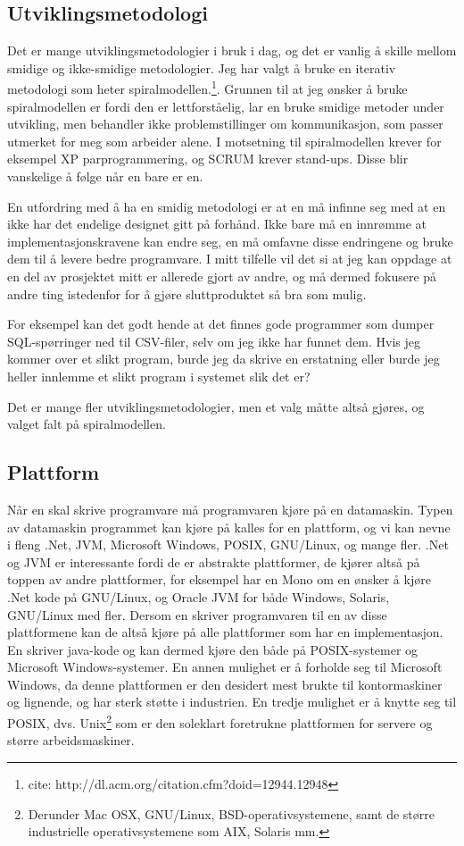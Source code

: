 \documentclass[11pt]{article}
\begin{document}
\subsection{Utviklingsmetodologi}
Det er mange utviklingsmetodologier i bruk i dag, og det er vanlig å skille mellom smidige og ikke-smidige metodologier. Jeg har valgt å bruke en iterativ metodologi som heter spiralmodellen.\footnote{cite: http://dl.acm.org/citation.cfm?doid=12944.12948}.
Grunnen til at jeg ønsker å bruke spiralmodellen er fordi den er lettforståelig, lar en bruke smidige metoder under utvikling, men behandler ikke problemstillinger om kommunikasjon, som passer utmerket for meg som arbeider alene.
I motsetning til spiralmodellen krever for eksempel XP parprogrammering, og SCRUM krever stand-ups. Disse blir vanskelige å følge når en bare er en.

En utfordring med å ha en smidig metodologi er at en må infinne seg med at en ikke har det endelige designet gitt på forhånd. Ikke bare må en innrømme at implementasjonskravene kan endre seg, en må omfavne disse endringene og bruke dem til å levere bedre programvare. I mitt tilfelle vil det si at jeg kan oppdage at en del av prosjektet mitt er allerede gjort av andre, og må dermed fokusere på andre ting istedenfor for å gjøre sluttproduktet så bra som mulig.

For eksempel kan det godt hende at det finnes gode programmer som dumper SQL-spørringer ned til CSV-filer, selv om jeg ikke har funnet dem. Hvis jeg kommer over et slikt program, burde jeg da skrive en erstatning eller burde jeg heller innlemme et slikt program i systemet slik det er?

Det er mange fler utviklingsmetodologier, men et valg måtte altså gjøres, og valget falt på spiralmodellen.

\subsection{Plattform}
Når en skal skrive programvare må programvaren kjøre på en datamaskin. Typen av datamaskin programmet kan kjøre på kalles for en plattform, og vi kan nevne i fleng .Net, JVM, Microsoft Windows, POSIX, GNU/Linux, og mange fler.
.Net og JVM er interessante fordi de er abstrakte plattformer, de kjører altså på toppen av andre plattformer, for eksempel har en Mono om en ønsker å kjøre .Net kode på GNU/Linux, og Oracle JVM for både Windows, Solaris, GNU/Linux med fler.
Dersom en skriver programvaren til en av disse plattformene kan de altså kjøre på alle plattformer som har en implementasjon. En skriver java-kode og kan dermed kjøre den både på POSIX-systemer og Microsoft Windows-systemer.
En annen mulighet er å forholde seg til Microsoft Windows, da denne plattformen er den desidert mest brukte til kontormaskiner og lignende, og har sterk støtte i industrien.
En tredje mulighet er å knytte seg til POSIX, dvs. Unix\footnote{Derunder Mac OSX, GNU/Linux, BSD-operativsystemene, samt de større industrielle operativsystemene som AIX, Solaris mm.} som er den soleklart foretrukne plattformen for servere og større arbeidsmaskiner.
\end{document}
